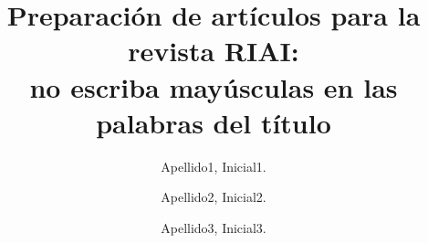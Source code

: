 \documentclass[5p,times,authoryear]{sciarticle}
\begin{document}
\begin{frontmatter}


\title{Preparación de artículos para la revista RIAI:\\
no escriba mayúsculas en las palabras del título}



\author[First]{Apellido1, Inicial1.}

\author[Second]{Apellido2, Inicial2.}

\author[Third]{Apellido3, Inicial3.}


\address[First]{Comité Español de Automática, Parc Tecnologic de Barcelona, Edifici U, C/ Llorens i Artigas, 4-6, 08028 Barcelona, España. }
\address[Second]{Departamento de Automática, Ingeniería Electrónica e Informática, Universidad Politécnica de Madrid,  C/ José Gutiérrez Abascal, nº2, 28006, Madrid,  España.}
\address[Third]{Departamento de Ingeniería de Sistemas y Automática,  Universitat Politécnica de Valencia, Camino de Vera, nº14, 46022, Valencia, España.}

\begin{comocitar}
\begin{center}
\begin{tcolorbox}[frame hidden, width=\linewidth*2, colframe=white, colback=black!8!white]
\end{tcolorbox}
\end{center}
\end{comocitar}


\end{frontmatter}
\end{document}
